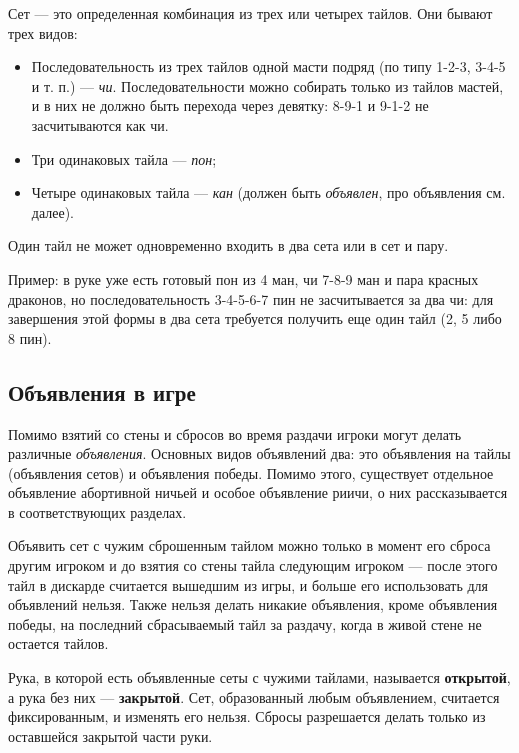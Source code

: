 Сет --- это определенная комбинация из трех или четырех тайлов. Они бывают трех видов:
\begin{itemize}
	\item Последовательность из трех тайлов одной масти подряд (по типу 1-2-3, 3-4-5 и т. п.) --- \textit{чи}. Последовательности можно собирать только из тайлов мастей, и в них не должно быть перехода через девятку: 8-9-1 и 9-1-2 не засчитываются как чи.
	\item Три одинаковых тайла --- \textit{пон};
	\item Четыре одинаковых тайла --- \textit{кан} (должен быть \textit{объявлен}, про объявления см. далее).
\end{itemize}

Один тайл не может одновременно входить в два сета или в сет и пару.
\begin{additional}
	
Пример: в руке уже есть готовый пон из 4 ман, чи 7-8-9 ман и пара красных драконов, но последовательность 3-4-5-6-7 пин не засчитывается за два чи: для завершения этой формы в два сета требуется получить еще один тайл (2, 5 либо 8 пин).


\end{additional}

\subsection{Объявления в игре}

Помимо взятий со стены и сбросов во время раздачи игроки могут делать различные \textit{объявления}. Основных видов объявлений два: это объявления на тайлы (объявления сетов) и объявления победы. Помимо этого, существует отдельное объявление абортивной ничьей и особое объявление риичи, о них рассказывается в соответствующих разделах.

 Объявить сет с чужим сброшенным тайлом можно только в момент его сброса другим игроком и до взятия со стены тайла следующим игроком --- после этого тайл в дискарде считается вышедшим из игры, и больше его использовать для объявлений нельзя. Также нельзя делать никакие объявления, кроме объявления победы, на последний сбрасываемый тайл за раздачу, когда в живой стене не остается тайлов.

Рука, в которой есть объявленные сеты с чужими тайлами, называется \textbf{открытой}, а рука без них --- \textbf{закрытой}. Сет, образованный любым объявлением, считается фиксированным, и изменять его нельзя. Сбросы разрешается делать только из оставшейся закрытой части руки.

